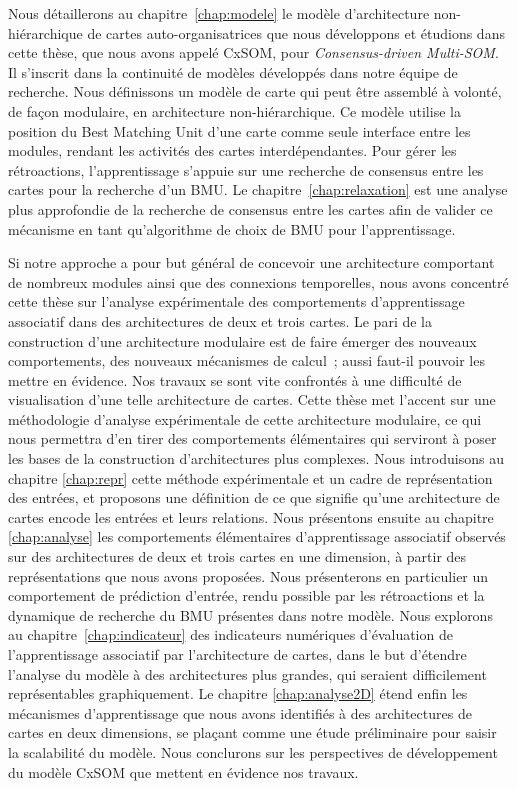 Nous détaillerons au chapitre~\ref{chap:modele} le modèle d'architecture non-hiérarchique de cartes auto-organisatrices que nous développons et étudions dans cette thèse, que nous avons appelé CxSOM, pour \emph{Consensus-driven Multi-SOM}. Il s'inscrit dans la continuité de modèles développés dans notre équipe de recherche.
Nous définissons un modèle de carte qui peut être assemblé à volonté, de façon modulaire, en architecture non-hiérarchique. Ce modèle utilise la position du Best Matching Unit d'une carte comme seule interface entre les modules, rendant les activités des cartes interdépendantes. Pour gérer les rétroactions, l'apprentissage s'appuie sur une recherche de consensus entre les cartes pour la recherche d'un BMU.
Le chapitre~\ref{chap:relaxation} est une analyse plus approfondie de la recherche de consensus entre les cartes afin de valider ce mécanisme en tant qu'algorithme de choix de BMU pour l'apprentissage.

Si notre approche a pour but général de concevoir une architecture comportant de nombreux modules ainsi que des connexions temporelles, nous avons concentré cette thèse sur l'analyse expérimentale des comportements d'apprentissage associatif dans des architectures de deux et trois cartes.
Le pari de la construction d'une architecture modulaire est de faire émerger des nouveaux comportements, des nouveaux mécanismes de calcul~; aussi faut-il pouvoir les mettre en évidence. Nos travaux se sont vite confrontés à une difficulté de visualisation d'une telle architecture de cartes. Cette thèse met l'accent sur une méthodologie d'analyse expérimentale de cette architecture modulaire, ce qui nous permettra d'en tirer des comportements élémentaires qui serviront à poser les bases de la construction d'architectures plus complexes.
Nous introduisons au chapitre \ref{chap:repr} cette méthode expérimentale et un cadre de représentation des entrées, et proposons une définition de ce que signifie qu'une architecture de cartes encode les entrées et leurs relations.
Nous présentons ensuite au chapitre \ref{chap:analyse} les comportements élémentaires d'apprentissage associatif observés sur des architectures de deux et trois cartes en une dimension, à partir des représentations que nous avons proposées. Nous présenterons en particulier un comportement de prédiction d'entrée, rendu possible par les rétroactions et la dynamique de recherche du BMU présentes dans notre modèle.
Nous explorons au chapitre~\ref{chap:indicateur} des indicateurs numériques d'évaluation de l'apprentissage associatif par l'architecture de cartes, dans le but d'étendre l'analyse du modèle à des architectures plus grandes, qui seraient difficilement représentables graphiquement.
Le chapitre \ref{chap:analyse2D} étend enfin les mécanismes d'apprentissage que nous avons identifiés à des architectures de cartes en deux dimensions, se plaçant comme une étude préliminaire pour saisir la scalabilité du modèle.
Nous conclurons sur les perspectives de développement du modèle CxSOM que mettent en évidence nos travaux.

